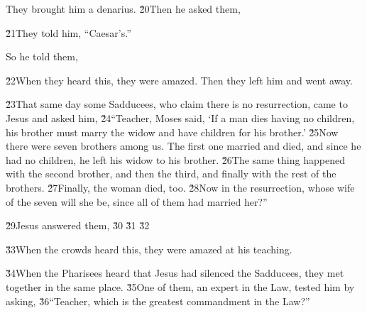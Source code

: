 They brought him a denarius. \v{20}Then he asked them, 

\v{21}They told him, ``Caesar's.''

So he told them, 

\v{22}When they heard this, they were amazed. Then they left him and went away.

\v{23}That same day some Sadducees, who claim there is no resurrection, came to Jesus and asked him, \v{24}``Teacher, Moses said, `If a man dies having no children, his brother must marry the widow and have children for his brother.' \v{25}Now there were seven brothers among us. The first one married and died, and since he had no children, he left his widow to his brother. \v{26}The same thing happened with the second brother, and then the third, and finally with the rest of the brothers. \v{27}Finally, the woman died, too. \v{28}Now in the resurrection, whose wife of the seven will she be, since all of them had married her?''

\v{29}Jesus answered them,  \v{30} \v{31} \v{32}

\v{33}When the crowds heard this, they were amazed at his teaching.

\v{34}When the Pharisees heard that Jesus had silenced the Sadducees, they met together in the same place. \v{35}One of them, an expert in the Law, tested him by asking, \v{36}``Teacher, which is the greatest commandment in the Law?''

